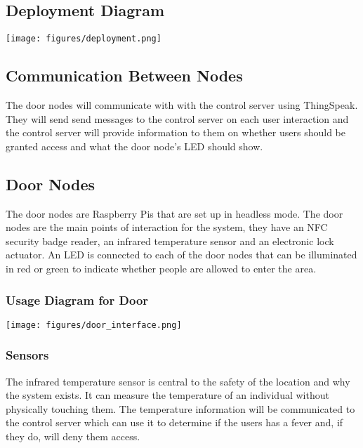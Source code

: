 \subsection{Deployment Diagram}

\texttt{[image: figures/deployment.png]}

\subsection{Communication Between Nodes}
The door nodes will communicate with with the control server using ThingSpeak.
They will send send messages to the control server on each user interaction and
the control server will provide information to them on whether users should be
granted access and what the door node's LED should show.

\subsection{Door Nodes}
The door nodes are Raspberry Pis that are set up in headless mode. The door
nodes are the  main points of interaction for the system, they have an NFC
security badge reader, an infrared temperature sensor and an electronic lock
actuator. An LED is connected to each of the door nodes that can be illuminated
in red or green to indicate whether people are allowed to enter the area.


\subsubsection{Usage Diagram for Door}

\texttt{[image: figures/door\_interface.png]}

\subsubsection{Sensors}
The infrared temperature sensor is central to the safety of the location
and why the system exists. It can measure the temperature of an individual
without physically touching them. The temperature information will be
communicated to the control server which can use it to determine if the users
has a fever and, if they do, will deny them access.

